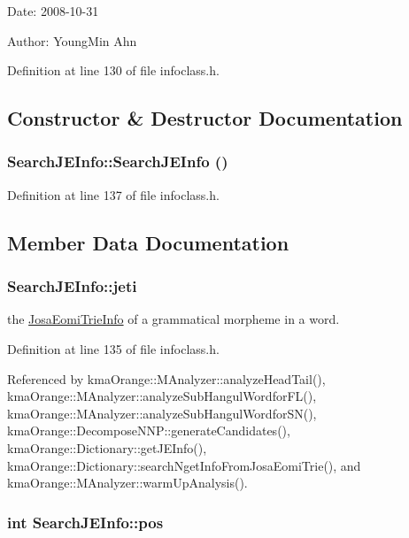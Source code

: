 \begin{Desc}
\item[Date:]2008-10-31 \end{Desc}
\begin{Desc}
\item[Author:]YoungMin Ahn \end{Desc}


Definition at line 130 of file infoclass.h.

\subsection{Constructor \& Destructor Documentation}
\hypertarget{classSearchJEInfo_d4e8898e38d35343a687a23123bd8592}{
\subsubsection[{SearchJEInfo}]{\setlength{\rightskip}{0pt plus 5cm}SearchJEInfo::SearchJEInfo ()}}
\label{classSearchJEInfo_d4e8898e38d35343a687a23123bd8592}




Definition at line 137 of file infoclass.h.

\subsection{Member Data Documentation}
\hypertarget{classSearchJEInfo_dac85ff8226c9c1e9f8810578edd78d0}{
\subsubsection[{jeti}]{ {\bf SearchJEInfo::jeti}}}
\label{classSearchJEInfo_dac85ff8226c9c1e9f8810578edd78d0}


the \hyperlink{classJosaEomiTrieInfo}{JosaEomiTrieInfo} of a grammatical morpheme in a word. 



Definition at line 135 of file infoclass.h.

Referenced by kmaOrange::MAnalyzer::analyzeHeadTail(), kmaOrange::MAnalyzer::analyzeSubHangulWordforFL(), kmaOrange::MAnalyzer::analyzeSubHangulWordforSN(), kmaOrange::DecomposeNNP::generateCandidates(), kmaOrange::Dictionary::getJEInfo(), kmaOrange::Dictionary::searchNgetInfoFromJosaEomiTrie(), and kmaOrange::MAnalyzer::warmUpAnalysis().\hypertarget{classSearchJEInfo_d0650a6510380f4cae43044766f8b1d9}{
\subsubsection[{pos}]{\setlength{\rightskip}{0pt plus 5cm}int {\bf SearchJEInfo::pos}}}
\label{classSearchJEInfo_d0650a6510380f4cae43044766f8b1d9}


